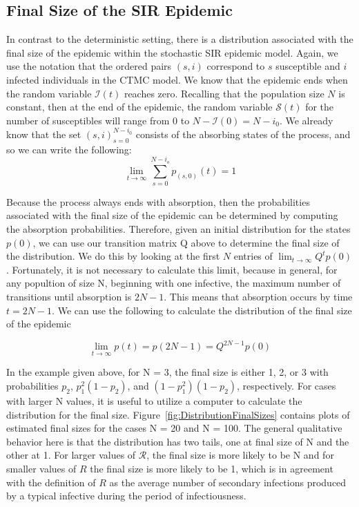 \documentclass[reqno,11pt]{amsart}
\begin{document}
\subsection{Final Size of the SIR Epidemic}
In contrast to the deterministic setting, there is a distribution associated with the final size of the epidemic within the stochastic SIR epidemic model. Again, we use the notation that the ordered pairs $(s,i)$ correspond to $ s $ susceptible and $ i $ infected individuals in the CTMC model. We know that the epidemic ends when the random variable $\mathcal I(t)$ reaches zero. Recalling that the population size $N$ is constant, then at the end of the epidemic, the random variable $\mathcal S(t)$ for the number of susceptibles will range from 0 to $N - \mathcal I(0) = N - i_0$. We already know that the set ${(s,i)}_{s=0}^{N-i_0}$ consists of the absorbing states of the process, and so we can write the following:
\begin{equation*}
\lim _{t \rightarrow \infty} \sum _{s=0}^{N-i_o} p_{(s,0)} (t) = 1
\end{equation*}

Because the process always ends with absorption, then the probabilities associated with the final size of the epidemic can be determined by computing the absorption probabilities. Therefore, given an initial distribution for the states $p(0)$, we can use our transition matrix Q above to determine the final size of the distribution. We do this by looking at the first $N$ entries of $\lim _{t \rightarrow \infty} Q^t p(0)$. Fortunately, it is not necessary to calculate this limit, because in general, for any popultion of size N, beginning with one infective, the maximum number of transitions until absorption is $2N-1$. This means that absorption occurs by time $t = 2N-1$. We can use the following to calculate the distribution of the final size of the epidemic

\begin{equation}
\lim _{t \rightarrow \infty} p(t) = p(2N-1) = Q^{2N-1}p(0)
\end{equation}

In the example given above, for N = 3, the final size is either 1, 2, or 3 with probabilities $p_2$, $p_1^2(1-p_2)$, and $ (1-p_1^2)(1-p_2)$, respectively. For cases with larger N values, it is useful to utilize a computer to calculate the distribution for the final size. Figure~\ref{fig:DistributionFinalSizes} contains plots of estimated final sizes for the cases N = 20 and N = 100. The general qualitative behavior here is that the distribution has two tails, one at final size of N and the other at 1. For larger values of $\mathcal R$, the final size is more likely to be N and for smaller values of $R$ the final size is more likely to be 1, which is in agreement with the definition of $R$ as the average number of secondary infections produced by a typical infective during the period of infectiousness.
\end{document}

